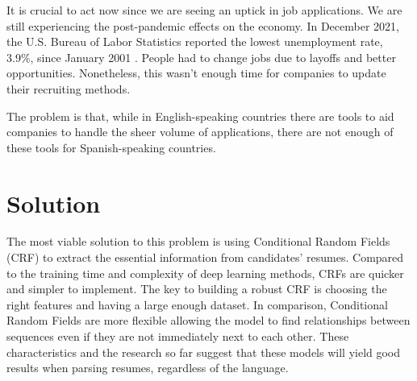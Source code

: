   It is crucial to act now since we are seeing an uptick in job
  applications. We are still experiencing the post-pandemic effects on the
  economy. In December 2021, the U.S. Bureau of Labor Statistics reported the
  lowest unemployment rate, 3.9\%, since January 2001 \cite{Kurt2022}. People
  had to change jobs due to layoffs and better opportunities. Nonetheless, this
  wasn't enough time for companies to update their recruiting methods.

  \vskip 35pt
  The problem is that, while in English-speaking countries there are tools to
  aid companies to handle the sheer volume of applications, there are not
  enough of these tools for Spanish-speaking countries.



\chapter{Solution} %

\label{Cap4} %


  The most viable solution to this problem is using Conditional Random Fields
  (CRF) to extract the essential information from candidates' resumes. Compared
  to the training time and complexity of deep learning methods, CRFs are
  quicker and simpler to implement. The key to building a robust CRF is
  choosing the right features and having a large enough dataset. In comparison,
  Conditional Random Fields are more flexible allowing the model to find
  relationships between sequences even if they are not immediately next to each
  other. These characteristics and the research so far suggest that these
  models will yield good results when parsing resumes, regardless of the
  language.

